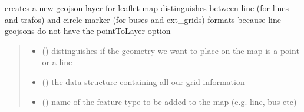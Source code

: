\documentclass[letterpaper,10pt,english]{sphinxmanual}
\begin{document}

\begin{fulllineitems}
\label{\detokenize{docs_gui/js_api/urbs_editor/generate_urbs_setup_editor:addGeoJSONtoUrbsEditorMap}}
\pysigstartsignatures
{}
\pysigstopsignatures
\sphinxAtStartPar
creates a new geojson layer for leaflet map
distinguishes between line (for lines and trafos) and circle marker (for buses and ext\_grids) formats
because line geojsons do not have the pointToLayer option
\begin{quote}\begin{description}
\begin{itemize}
\item {} 
\sphinxAtStartPar
{} () \textendash{} distinguishes if the geometry we want to place on the map is a point or a line

\item {} 
\sphinxAtStartPar
{} () \textendash{} the data structure containing all our grid information

\item {} 
\sphinxAtStartPar
{} () \textendash{} name of the feature type to be added to the map (e.g. line, bus etc)

\end{itemize}

\end{description}\end{quote}

\end{fulllineitems}

\end{document}
